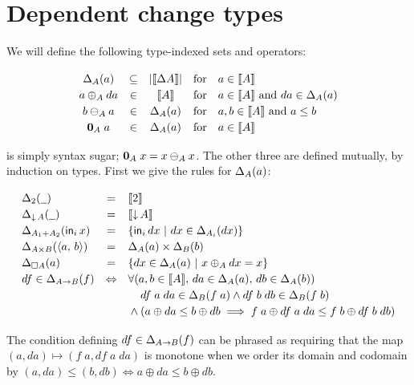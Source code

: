 \documentclass{article}
\begin{document}

\section{Dependent change types}

We will define the following type-indexed sets and operators:

\[\begin{array}{ccccl}
  \Changes{A}{a} &\subseteq& |\Den{\GD{A}}|
  &\text{for}& a \in \Den{A}
  \\
  a \oplus_A da &\in& \Den{A}
  &\text{for}& a \in \Den{A} ~\text{and}~ da \in \Changes{A}{a}
  \\
  b \ominus_A a &\in& \Changes{A}{a}
  &\text{for}& a, b \in \Den{A} ~\text{and}~ a \le b
  \\
  \zero_A\; a &\in& \Changes{A}{a}
  &\text{for}& a \in \Den{A}
\end{array}\]

\zero{} is simply syntax sugar; $\mathbf{0}_A\; x = x \ominus_A x$. The other three
are defined mutually, by induction on types. First we give the rules for
$\Delta_{A}({a})$:

\[
\def\arraystretch{1.2}
\begin{array}{lcl}
  \Changes{\tbool}{\pwild} &=& \Den{\tbool}
  \\
  \Changes{\Down{A}}{\pwild} &=& \Den{\Down{A}}
  \\
  \Changes{A_1 + A_2}{\inj{i}{x}}
  &=& \setfor{\inj{i}{dx}}{dx \in \Changes{A_i}{dx}}
  \\
  \Changes{A \x B}{\pair{a}{b}}
  &=& \Changes{A}{a} \x \Changes{B}{b}
  \\
  \Changes{\Disc{A}}{a}
  &=& \setfor{dx \in \Changes{A}{a}}{x \oplus_A dx = x}
  \\
  df \in \Changes{A \to B}{f}
  &\Leftrightarrow&
  \forall({a,b \in \Den{A}},\, da \in \Changes{A}{a},\, db \in \Changes{A}{b})\\
  &&\phantom{{}\wedge{}}
  df\; a\; da \in \Changes{B}{f\; a}
  \wedge df\;b\;db \in \Changes{B}{f\; b}
  \\
  &&{}\wedge (a \oplus da \le b \oplus db \implies
  f\;a \oplus df\;a\;da \le f\;b \oplus df\;b\;db)
\end{array}
\]

The condition defining $df \in \Delta_{A \to B}({f})$ can be phrased as requiring
that the map $(a, da) \mapsto (f\;a, df\;a\;da)$ is monotone when we order its
domain and codomain by $(a,da) \le (b,db) \iff a \oplus da \le b \oplus db$.
\end{document}
